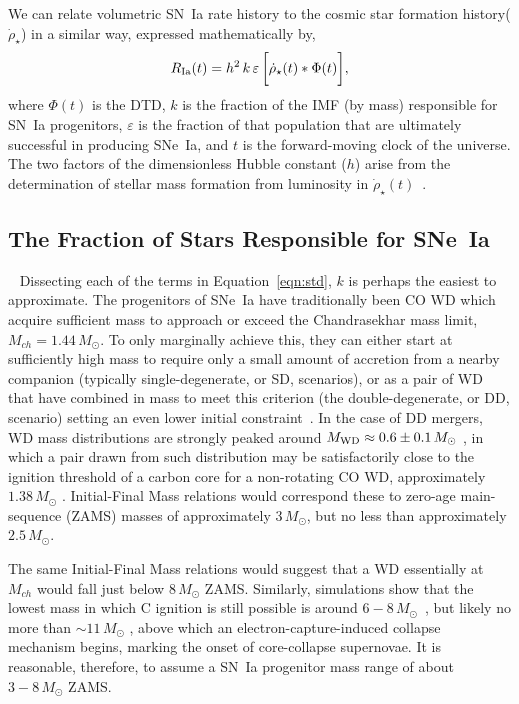 \documentclass[apj]{aastex62}
\begin{document}
We can relate volumetric SN~Ia rate history to the cosmic star formation history($\dot{\rho}_{\star}$) in a similar way, expressed mathematically by, 
\begin{equation}
R_{\rm Ia}(t) =  h^2\,k\,\varepsilon\,\biggl[\dot{\rho}_{\star}(t) \ast \Phi(t)\biggr],
\label{eqn:std}
\end{equation}
\noindent where $\Phi(t)$ is the DTD, $k$ is the fraction of the IMF (by mass) responsible for SN~Ia progenitors, $\varepsilon$ is the fraction of that population that are ultimately successful in producing SNe~Ia, and $t$ is the forward-moving clock of the universe. The two factors of the dimensionless Hubble constant ($h$) arise from the determination of stellar mass formation from luminosity in $\dot{\rho}_{\star}(t)$~\citep[see][]{Croton:2013ty}.

\subsection{The Fraction of Stars Responsible for SNe~Ia}~\label{sec:wds}
Dissecting each of the terms in Equation~\ref{eqn:std}, $k$ is perhaps the easiest to approximate. The progenitors of SNe~Ia have traditionally been CO WD which acquire sufficient mass to approach or exceed the Chandrasekhar mass limit, $M_{ch}=1.44\,M_{\odot}$. To only marginally achieve this, they can either start at sufficiently high mass to require only a small amount of accretion from a nearby companion (typically single-degenerate, or SD, scenarios), or as a pair of WD that have combined in mass to meet this criterion (the double-degenerate, or DD, scenario) setting an even lower initial constraint~\cite[see][ for a review]{Maoz:2013}. In the case of DD mergers, WD mass distributions are strongly peaked around $M_{\rm WD}\approx0.6\pm0.1\,M_{\odot}$ \citep{Catalan:2008il}, in which a pair drawn from such distribution may be satisfactorily close to the ignition threshold of a carbon core for a non-rotating CO WD, approximately $1.38\, M_{\odot}$ \citep{Arnett:1969dw, Nomoto:1982vh,Pakmor:2013gf}. Initial-Final Mass relations \cite[e.g.,][]{Catalan:2008il,Cummings:2018oe} would correspond these to zero-age main-sequence (ZAMS) masses of approximately $3\, M_{\odot}$, but no less than approximately $2.5\, M_{\odot}$. 

The same Initial-Final Mass relations would suggest that a WD essentially at $M_{ch}$ would fall just below $8\, M_{\odot}$ ZAMS. Similarly, simulations show that the lowest mass in which C ignition is still possible is around $6-8 \,M_{\odot}$~\cite{Chen:2014rb,Denissenkov:2015rf}, but likely no more than $\sim11\, M_{\odot}$ \citep{Takahashi:2013jx}, above which an electron-capture-induced collapse mechanism begins, marking the onset of core-collapse supernovae. It is reasonable, therefore, to assume a SN~Ia progenitor mass range of about $3-8\,M_{\odot}$ ZAMS. 
\end{document}
